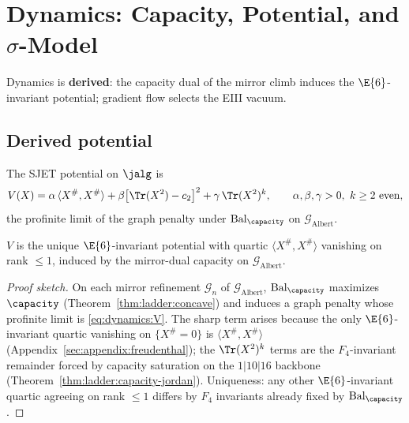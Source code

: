 \section{Dynamics: Capacity, Potential, and $\sigma$-Model}
\label{sec:dynamics}

Dynamics is \textbf{derived}: the capacity dual of the mirror climb induces the
$\E{6}$-invariant potential; gradient flow selects the EIII vacuum.

\subsection{Derived potential}
\label{sec:dynamics:potential}

\begin{definition}\label{def:dynamics:Vdef}
The SJET potential on $\jalg$ is
\begin{equation}\label{eq:dynamics:V}
  V(X)=\alpha\,\langle X^{\#},X^{\#}\rangle
  +\beta\bigl[\Tr(X^2)-c_2\bigr]^2
  +\gamma\,\Tr(X^2)^k,
  \qquad \alpha,\beta,\gamma>0,\ k\geq2\ \text{even},
\end{equation}
the profinite limit of the graph penalty under $\mathrm{Bal}_\capacity$ on
$\mathcal{G}_{\mathrm{Albert}}$.
\end{definition}

\begin{theorem}\label{thm:dynamics:potential}
$V$ is the unique $\E{6}$-invariant potential with quartic
$\langle X^{\#},X^{\#}\rangle$ vanishing on rank $\leq1$, induced by the
mirror-dual capacity on $\mathcal{G}_{\mathrm{Albert}}$.
\end{theorem}

\begin{proof}[Proof sketch]
On each mirror refinement $\mathcal{G}_n$ of $\mathcal{G}_{\mathrm{Albert}}$,
$\mathrm{Bal}_\capacity$ maximizes $\capacity$ (Theorem~\ref{thm:ladder:concave})
and induces a graph penalty whose profinite limit is \eqref{eq:dynamics:V}.
The sharp term arises because the only $\E{6}$-invariant quartic vanishing on
$\{X^{\#}=0\}$ is $\langle X^{\#},X^{\#}\rangle$
(Appendix~\ref{sec:appendix:freudenthal}); the $\Tr(X^2)^k$ terms are the
$F_4$-invariant remainder forced by capacity saturation on the $1|10|16$
backbone (Theorem~\ref{thm:ladder:capacity-jordan}). Uniqueness: any other
$\E{6}$-invariant quartic agreeing on rank $\leq1$ differs by $F_4$ invariants
already fixed by $\mathrm{Bal}_\capacity$.
\end{proof}

